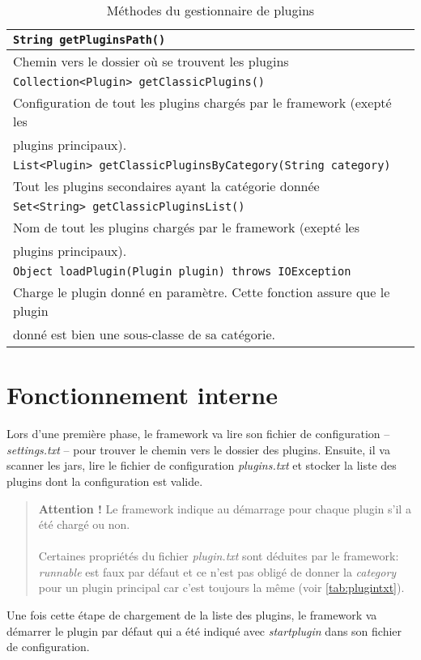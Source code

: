 \documentclass[12pt,a4paper]{article}
\begin{document}
\begin{table}[h]
	\begin{tabular}{|l|}
		\hline
		\texttt{String getPluginsPath()}\\
		\hline
		Chemin vers le dossier où se trouvent les plugins\\
		\hline			

		\hline
		\texttt{Collection<Plugin> getClassicPlugins()}\\
		\hline
		Configuration de tout les plugins chargés par le framework (exepté les\\ 
		plugins	principaux).\\
		\hline
	
		\hline
		\texttt{List<Plugin> getClassicPluginsByCategory(String category)}\\
		\hline
		Tout les plugins secondaires ayant la catégorie donnée\\
		\hline

		\hline
		\texttt{Set<String> getClassicPluginsList()}\\
		\hline
		Nom de tout les plugins chargés par le framework (exepté les \\
		plugins	principaux).\\
		\hline
			
		\hline
		\texttt{Object loadPlugin(Plugin plugin) throws IOException}\\
		\hline
		Charge le plugin donné en paramètre. Cette fonction assure que le plugin\\
		donné est bien une sous-classe de sa catégorie.\\
		\hline
	\end{tabular}	
\caption{Méthodes du gestionnaire de plugins}
\end{table}

\section{Fonctionnement interne}
Lors d'une première phase, le framework va lire son fichier de configuration -- 
\emph{settings.txt} -- pour trouver le chemin vers le dossier des plugins. 
Ensuite, il va scanner les jars, lire le fichier de configuration 
\emph{plugins.txt} et stocker la liste des plugins dont la configuration est valide.

\begin{quote}
	\textbf{Attention !} Le framework indique au démarrage pour chaque plugin 
	s'il a été chargé ou non. 
	\\\\
	Certaines propriétés du fichier \emph{plugin.txt} sont déduites par le 
	framework: \emph{runnable} est faux par défaut et ce n'est pas obligé de 
	donner la \emph{category} pour un plugin principal car c'est toujours la 
	même (voir \ref{tab:plugintxt}).
\end{quote}

Une fois cette étape de chargement de la liste des plugins, le framework va 
démarrer le plugin par défaut qui a été indiqué avec \emph{startplugin} dans son 
fichier de configuration.

\end{document}
